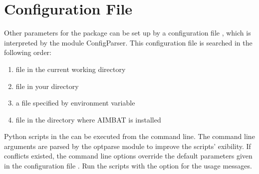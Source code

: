 \documentclass[letterpaper,10pt,english]{sphinxmanual}
\begin{document}
\section{Configuration File}
\label{docfiles/parameterConfiguration:configuration-file}
Other parameters for the package can be set up by a configuration file , which is interpreted by the module ConfigParser. This configuration file is searched in the following order:
\begin{enumerate}
\item {} 
file  in the current working directory

\item {} 
file  in your  directory

\item {} 
a file specified by environment variable 

\item {} 
file  in the directory where AIMBAT is installed

\end{enumerate}

Python scripts in the  can be executed from the command line. The command line arguments are parsed by the optparse module to improve the scripts' exibility. If conflicts existed, the command line options override the default parameters given in the configuration file . Run the scripts with the  option for the usage messages.
\end{document}
